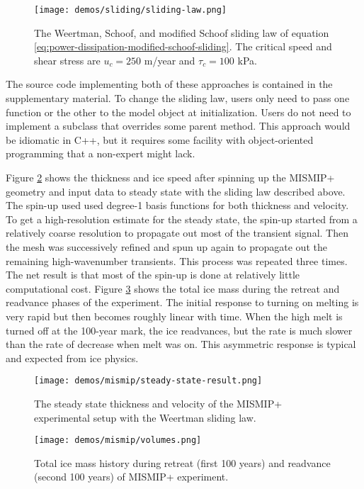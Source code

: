 \documentclass[journal abbreviation, manuscript]{copernicus}
\begin{document}
\begin{figure}[h]
    \texttt{[image: demos/sliding/sliding-law.png]}
    \caption{The Weertman, Schoof, and modified Schoof sliding law of equation \eqref{eq:power-dissipation-modified-schoof-sliding}.
    The critical speed and shear stress are $u_c = 250$ m/year and $\tau_c = 100$ kPa.}
    \label{fig:sliding-laws}
\end{figure}

The source code implementing both of these approaches is contained in the supplementary material.
To change the sliding law, users only need to pass one function or the other to the model object at initialization.
Users do not need to implement a subclass that overrides some parent method.
This approach would be idiomatic in C++, but it requires some facility with object-oriented programming that a non-expert might lack.

Figure \ref{fig:mismip-result} shows the thickness and ice speed after spinning up the MISMIP+ geometry and input data to steady state with the sliding law described above.
The spin-up used used degree-1 basis functions for both thickness and velocity.
To get a high-resolution estimate for the steady state, the spin-up started from a relatively coarse resolution to propagate out most of the transient signal.
Then the mesh was successively refined and spun up again to propagate out the remaining high-wavenumber transients.
This process was repeated three times.
The net result is that most of the spin-up is done at relatively little computational cost.
Figure \ref{fig:mismip-volumes} shows the total ice mass during the retreat and readvance phases of the experiment.
The initial response to turning on melting is very rapid but then becomes roughly linear with time.
When the high melt is turned off at the 100-year mark, the ice readvances, but the rate is much slower than the rate of decrease when melt was on.
This asymmetric response is typical and expected from ice physics.

\begin{figure}[h]
    \texttt{[image: demos/mismip/steady-state-result.png]}
    \caption{The steady state thickness and velocity of the MISMIP+ experimental setup with the Weertman sliding law.}
    \label{fig:mismip-result}
\end{figure}

\begin{figure}[h]
    \texttt{[image: demos/mismip/volumes.png]}
    \caption{Total ice mass history during retreat (first 100 years) and readvance (second 100 years) of MISMIP+ experiment.}
    \label{fig:mismip-volumes}
\end{figure}
\end{document}
